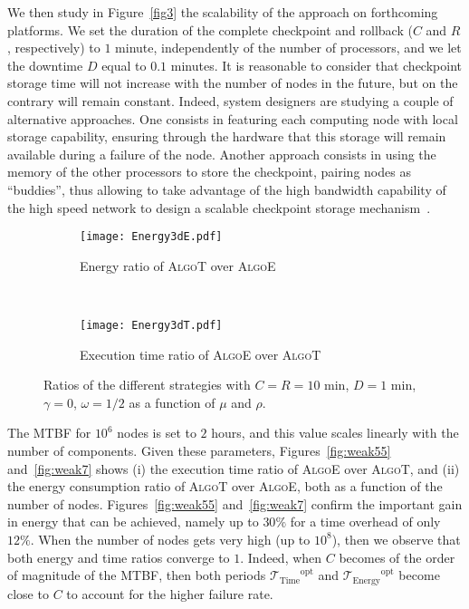 \documentclass[a4paper]{article}
\newcommand{\ema}[1]{\ensuremath{#1}\xspace}
\newcommand{\ccc}{\ema{C}}
\newcommand{\rrr}{\ema{R}}
\newcommand{\ddd}{\ema{D}}
\renewcommand{\time}[1][]{\ema{\mathcal{T}_{\text{#1}}}}
\newcommand{\toptT}{\ema{\time[Time]^{\text{opt}}}}
\newcommand{\toptE}{\ema{\time[Energy]^{\text{opt}}}}
\newcommand{\workduringckpt}{\omega}
\newcommand{\dos}{\gamma}
\newcommand{\ratio}{\rho}
\newcommand{\algoE}{\textsc{AlgoE}\xspace}
\newcommand{\algoT}{\textsc{AlgoT}\xspace}
\begin{document}
We then study in Figure~\ref{fig3} the scalability
of the approach on forthcoming platforms. 
We set the duration of the complete checkpoint and rollback
(\ccc and \rrr, respectively) to $1$ minute, independently of the number of processors,
and we let the downtime \ddd equal to $0.1$ minutes. 
It is reasonable to consider that checkpoint
storage time will not increase with the number of nodes in the future, but on the
contrary will remain constant. Indeed, system designers
are studying a couple of alternative approaches. One consists in
featuring each computing node with local storage capability, ensuring
through the hardware that this storage will remain available during a
failure of the node. Another approach consists in using the memory of
the other processors to store the checkpoint, pairing nodes as
``buddies'', thus allowing to take advantage of the high bandwidth
capability of the high speed network to design a scalable checkpoint
storage mechanism~\cite{ZhengShiKale2004,NiClusterFT12,buddy,OnePetabSecondCheckpoint}.


\begin{figure}
    \centering
  \begin{subfigure}[b]{0.7\textwidth}
    \centering
    \texttt{[image: Energy3dE.pdf]}
    \caption{Energy ratio of \algoT over \algoE}
\label{fig:3d:energy}
  \end{subfigure}\\
  \begin{subfigure}[b]{0.7\textwidth}
    \centering
    \texttt{[image: Energy3dT.pdf]}
    \caption{Execution time ratio of \algoE over \algoT} \label{fig:3d:time}
  \end{subfigure}
  \caption{Ratios of the different strategies with $C=R=10$ min, $D=1$ min, $\dos=0$, $\workduringckpt=1/2$
  as a function of $\mu$ and $\ratio$.   \label{fig:3d}}
\end{figure}


The MTBF for $10^{6}$ nodes is set to $2$ hours, and this value scales linearly with
the number of components. 
Given these parameters, Figures~\ref{fig:weak55} and~\ref{fig:weak7} 
shows (i) the execution time ratio of \algoE over \algoT, 
and (ii) the energy consumption ratio of \algoT over \algoE, both as a function of the 
number of nodes.
Figures~\ref{fig:weak55} and~\ref{fig:weak7} confirm the important gain in energy that can be achieved,
namely up to $30\%$ for a time overhead of only $12\%$.
When the number of nodes gets very high (up to $10^{8}$), then we observe that both energy and 
time ratios converge to $1$. Indeed, when  \ccc becomes of the order of magnitude of the MTBF,
then both periods \toptT and \toptE become close to \ccc to account for the higher failure rate. 
\end{document}
